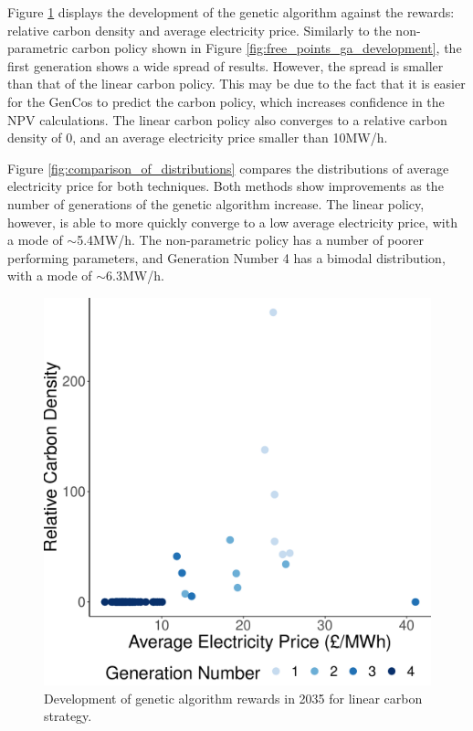 Figure \ref{fig:linear_ga_development} displays the development of the genetic algorithm against the rewards: relative carbon density and average electricity price. Similarly to the non-parametric carbon policy shown in Figure \ref{fig:free_points_ga_development}, the first generation shows a wide spread of results. However, the spread is smaller than that of the linear carbon policy. This may be due to the fact that it is easier for the GenCos to predict the carbon policy, which increases confidence in the NPV calculations. The linear carbon policy also converges to a relative carbon density of 0, and an average electricity price smaller than \textsterling10MW/h.

Figure \ref{fig:comparison_of_distributions} compares the distributions of average electricity price for both techniques. Both methods show improvements as the number of generations of the genetic algorithm increase.  The linear policy, however, is able to more quickly converge to a low average electricity price, with a mode of ${\sim}$\textsterling5.4MW/h. The non-parametric policy has a number of poorer performing parameters, and Generation Number 4 has a bimodal distribution, with a mode of ${\sim}$\textsterling6.3MW/h.

\begin{figure}
	\centering
	\includegraphics[width=0.5\linewidth]{Chapter6/figures/results/linear_ga_development.pdf}
	\caption{Development of genetic algorithm rewards in 2035 for linear carbon strategy.}
	\label{fig:linear_ga_development}
\end{figure}





